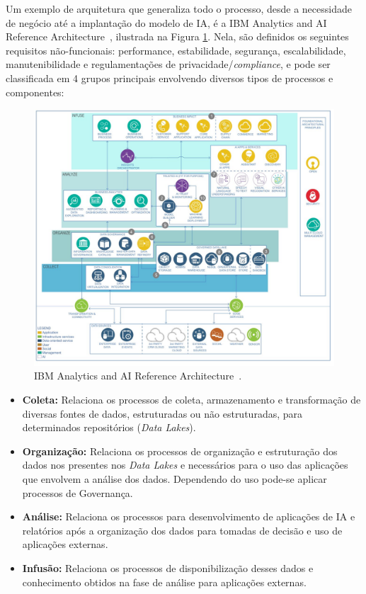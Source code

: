 \documentclass[Portugues,Final]{ic-tese-v3}
\begin{document}
Um exemplo de arquitetura que generaliza todo o processo, desde a necessidade de negócio até a implantação do modelo de IA, é a IBM Analytics and AI Reference Architecture~\cite{IBM_2021}, ilustrada na Figura \ref{fig:AIReferenceArchitecture}. Nela, são definidos os seguintes requisitos não-funcionais: performance, estabilidade, segurança, escalabilidade, manutenibilidade e regulamentações de privacidade/\textit{compliance}, e pode ser classificada em 4 grupos principais envolvendo diversos tipos de processos e componentes:

\begin{figure}[h]
\centering
\includegraphics[scale=0.25]{images/ai-analytics-ref-diagram-analyze.jpg}
\caption {IBM Analytics and AI Reference Architecture~\cite{IBM_2021}.}
\label{fig:AIReferenceArchitecture}
\end{figure}

\begin{itemize}
\item \textbf{Coleta:} Relaciona os processos de coleta, armazenamento e transformação de diversas fontes de dados, estruturadas ou não estruturadas, para determinados repositórios (\textit{Data Lakes}).
\item \textbf{Organização:} Relaciona os processos de organização e estruturação dos dados nos presentes nos \textit{Data Lakes} e necessários para o uso das aplicações que envolvem a análise dos dados. Dependendo do uso pode-se aplicar processos de Governança.
\item \textbf{Análise:} Relaciona os processos para desenvolvimento de aplicações de IA e relatórios após a organização dos dados para tomadas de decisão e uso de aplicações externas.
\item \textbf{Infusão:} Relaciona os processos de disponibilização desses dados e conhecimento obtidos na fase de análise para aplicações externas.
\end{itemize}
\end{document}
